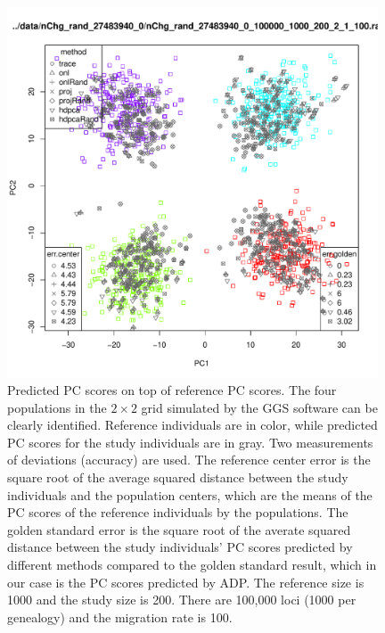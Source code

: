 \documentclass{article}
\begin{document}
\begin{figure}[p]
  \centering
  \includegraphics[width=0.98\textwidth]{n1000}
  \caption{
    Predicted PC scores on top of reference PC scores.
    The four populations in the $2 \times 2$ grid simulated by the GGS software can be clearly identified.
    Reference individuals are in color,
    while predicted PC scores for the study individuals are in gray.
    Two measurements of deviations (accuracy) are used.
    The reference center error is the square root of the average squared distance between the study individuals and the population centers, which are the means of the PC scores of the reference individuals by the populations.
    The golden standard error is the square root of the averate squared distance between the study individuals' PC scores predicted by different methods compared to the golden standard result, which in our case is the PC scores predicted by ADP.
    The reference size is 1000 and the study size is 200.
    There are 100,000 loci (1000 per genealogy) and the migration rate is 100.
  }
  \label{fig:n1000}
\end{figure}
\end{document}
